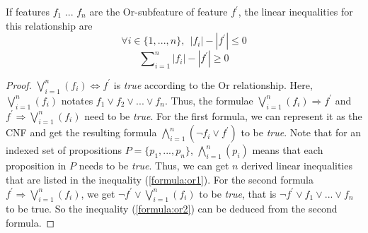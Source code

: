 \vspace{-2mm}
\begin{lem}If features $f_1$ ... $f_n$ are  the Or-subfeature of feature $f^\prime$, %
the linear inequalities for this relationship are
  \begin{equation}
  \forall  i \in  \{1,...,n\}, ~~ |f_i| -  |f^\prime|  \le 0  \label{formula:or1}
  \end{equation}
  \begin{equation}
  \sum\nolimits_{i=1}^{n}{|f_i|} - |f^\prime| \ge 0 \label{formula:or2}
  \end{equation}
\end{lem}
\begin{proof}
$\bigvee\nolimits_{i=1}^{n}({f_i})  \Leftrightarrow f^\prime $ is \emph{true} according to the Or relationship. Here, $\bigvee\nolimits_{i=1}^{n}({f_i})$ notates $f_1 \lor f_2 \lor ... \lor f_n $. Thus, the formulae $\bigvee\nolimits_{i=1}^{n}({f_i})  \Rightarrow f^\prime $ and $f^\prime \Rightarrow \bigvee\nolimits_{i=1}^{n}({f_i})$ need to be \emph{true}. For the first formula, we can represent it as the CNF and get the resulting formula $\bigwedge \nolimits_{i=1}^{n}({\neg f_i \lor f^\prime})$  to be \emph{true}. Note that for an indexed set of propositions $P = \{p_1,...,p_n\}$, $\bigwedge\nolimits_{i=1}^{n}(p_i)$ means that each proposition in $P$ needs to be \emph{true}.  Thus, we can get $n$ derived linear  inequalities that are listed in the inequality (\ref{formula:or1}). For the second formula $f^\prime \Rightarrow \bigvee\nolimits_{i=1}^{n}({f_i})$, we get $\neg f^\prime \lor \bigvee\nolimits_{i=1}^{n}({f_i})$ to be \emph{true}, that is $ \neg f^\prime \lor f_1 \lor ... \lor f_n $ to be true. So the inequality   (\ref{formula:or2}) can be deduced from the second formula.
\end{proof}




